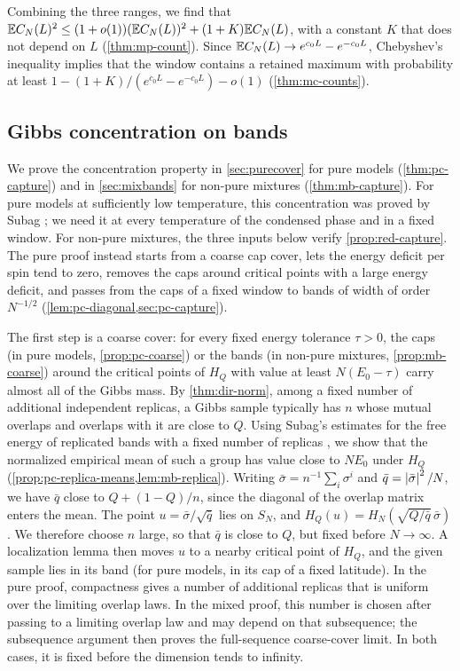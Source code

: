 Combining the three ranges, we find that $\mathbb E C_N(L)^2\le(1+o(1))(\mathbb E C_N(L))^2+(1+K)\mathbb E C_N(L)$, with a constant $K$ that does not depend on $L$ (\cref{thm:mp-count}). Since $\mathbb E C_N(L)\to e^{c_0L}-e^{-c_0L}$, Chebyshev's inequality implies that the window contains a retained maximum with probability at least $1-(1+K)/(e^{c_0L}-e^{-c_0L})-o(1)$ (\cref{thm:mc-counts}).

\subsection{Gibbs concentration on bands}\label{sec:ov-capture}

We prove the concentration property in \cref{sec:purecover} for pure models (\cref{thm:pc-capture}) and in \cref{sec:mixbands} for non-pure mixtures (\cref{thm:mb-capture}). For pure models at sufficiently low temperature, this concentration was proved by Subag \cite[Theorem~1]{Subag2017geometry}; we need it at every temperature of the condensed phase and in a fixed window. For non-pure mixtures, the three inputs below verify \cref{prop:red-capture}. The pure proof instead starts from a coarse cap cover, lets the energy deficit per spin tend to zero, removes the caps around critical points with a large energy deficit, and passes from the caps of a fixed window to bands of width of order $N^{-1/2}$ (\cref{lem:pc-diagonal,sec:pc-capture}).

The first step is a coarse cover: for every fixed energy tolerance $\tau>0$, the caps (in pure models, \cref{prop:pc-coarse}) or the bands (in non-pure mixtures, \cref{prop:mb-coarse}) around the critical points of $H_Q$ with value at least $N(E_0-\tau)$ carry almost all of the Gibbs mass. By \cref{thm:dir-norm}, among a fixed number of additional independent replicas, a Gibbs sample typically has $n$ whose mutual overlaps and overlaps with it are close to $Q$. Using Subag's estimates for the free energy of replicated bands with a fixed number of replicas \cite[Lemmas~17--19 and Proposition~24]{Subag2024}, we show that the normalized empirical mean of such a group has value close to $NE_0$ under $H_Q$ (\cref{prop:pc-replica-means,lem:mb-replica}). Writing $\bar\sigma=n^{-1}\sum_i\sigma^i$ and $\bar q=\left|\bar\sigma\right|^2/N$, we have $\bar q$ close to $Q+(1-Q)/n$, since the diagonal of the overlap matrix enters the mean. The point $u=\bar\sigma/\sqrt{\bar q}$ lies on $S_N$, and $H_Q(u)=H_N(\sqrt{Q/\bar q}\,\bar\sigma)$. We therefore choose $n$ large, so that $\bar q$ is close to $Q$, but fixed before $N\to\infty$. A localization lemma then moves $u$ to a nearby critical point of $H_Q$, and the given sample lies in its band (for pure models, in its cap of a fixed latitude). In the pure proof, compactness gives a number of additional replicas that is uniform over the limiting overlap laws. In the mixed proof, this number is chosen after passing to a limiting overlap law and may depend on that subsequence; the subsequence argument then proves the full-sequence coarse-cover limit. In both cases, it is fixed before the dimension tends to infinity.

